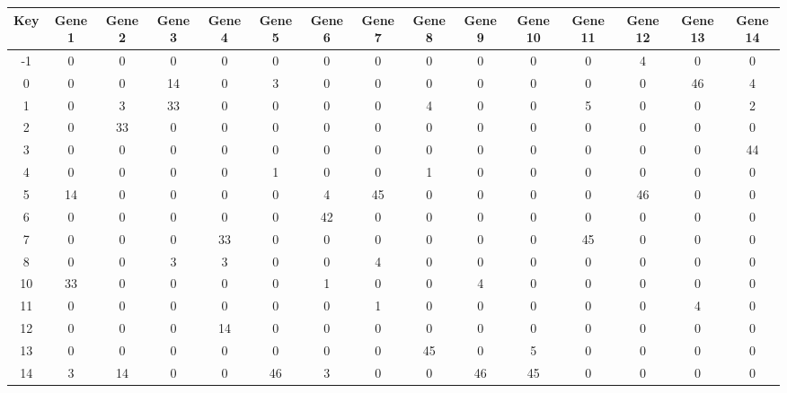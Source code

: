 \begin{tabular}{|c|c|c|c|c|c|c|c|c|c|c|c|c|c|c|}
\hline
Key & Gene 1 & Gene 2 & Gene 3 & Gene 4 & Gene 5 & Gene 6 & Gene 7 & Gene 8 & Gene 9 & Gene 10 & Gene 11 & Gene 12 & Gene 13 & Gene 14 \\
\hline
-1 & 0 & 0 & 0 & 0 & 0 & 0 & 0 & 0 & 0 & 0 & 0 & 4 & 0 & 0 \\
0 & 0 & 0 & 14 & 0 & 3 & 0 & 0 & 0 & 0 & 0 & 0 & 0 & 46 & 4 \\
1 & 0 & 3 & 33 & 0 & 0 & 0 & 0 & 4 & 0 & 0 & 5 & 0 & 0 & 2 \\
2 & 0 & 33 & 0 & 0 & 0 & 0 & 0 & 0 & 0 & 0 & 0 & 0 & 0 & 0 \\
3 & 0 & 0 & 0 & 0 & 0 & 0 & 0 & 0 & 0 & 0 & 0 & 0 & 0 & 44 \\
4 & 0 & 0 & 0 & 0 & 1 & 0 & 0 & 1 & 0 & 0 & 0 & 0 & 0 & 0 \\
5 & 14 & 0 & 0 & 0 & 0 & 4 & 45 & 0 & 0 & 0 & 0 & 46 & 0 & 0 \\
6 & 0 & 0 & 0 & 0 & 0 & 42 & 0 & 0 & 0 & 0 & 0 & 0 & 0 & 0 \\
7 & 0 & 0 & 0 & 33 & 0 & 0 & 0 & 0 & 0 & 0 & 45 & 0 & 0 & 0 \\
8 & 0 & 0 & 3 & 3 & 0 & 0 & 4 & 0 & 0 & 0 & 0 & 0 & 0 & 0 \\
10 & 33 & 0 & 0 & 0 & 0 & 1 & 0 & 0 & 4 & 0 & 0 & 0 & 0 & 0 \\
11 & 0 & 0 & 0 & 0 & 0 & 0 & 1 & 0 & 0 & 0 & 0 & 0 & 4 & 0 \\
12 & 0 & 0 & 0 & 14 & 0 & 0 & 0 & 0 & 0 & 0 & 0 & 0 & 0 & 0 \\
13 & 0 & 0 & 0 & 0 & 0 & 0 & 0 & 45 & 0 & 5 & 0 & 0 & 0 & 0 \\
14 & 3 & 14 & 0 & 0 & 46 & 3 & 0 & 0 & 46 & 45 & 0 & 0 & 0 & 0 \\
\hline
\end{tabular}